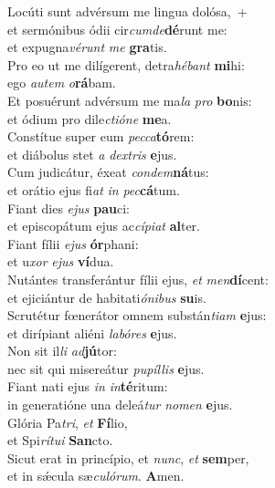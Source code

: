 \evenverse Locúti sunt advérsum me lingua dolósa,~+\\\evenverse  et sermónibus ódii cir\textit{cum}\textit{de}\textbf{dé}runt me:~\*\\
\evenverse et expugna\textit{vé}\textit{runt} \textit{me} \textbf{gra}tis.\\
\oddverse Pro eo ut me dilígerent, detra\textit{hé}\textit{bant} \textbf{mi}hi:~\*\\
\oddverse ego \textit{au}\textit{tem} \textit{o}\textbf{rá}bam.\\
\evenverse Et posuérunt advérsum me ma\textit{la} \textit{pro} \textbf{bo}nis:~\*\\
\evenverse et ódium pro dile\textit{cti}\textit{ó}\textit{ne} \textbf{me}a.\\
\oddverse Constítue super eum \textit{pec}\textit{ca}\textbf{tó}rem:~\*\\
\oddverse et diábolus stet \textit{a} \textit{dex}\textit{tris} \textbf{e}jus.\\
\evenverse Cum judicátur, éxeat \textit{con}\textit{dem}\textbf{ná}tus:~\*\\
\evenverse et orátio ejus fi\textit{at} \textit{in} \textit{pec}\textbf{cá}tum.\\
\oddverse Fiant dies \textit{e}\textit{jus} \textbf{pau}ci:~\*\\
\oddverse et episcopátum ejus ac\textit{cí}\textit{pi}\textit{at} \textbf{al}ter.\\
\evenverse Fiant fílii \textit{e}\textit{jus} \textbf{ór}phani:~\*\\
\evenverse et u\textit{xor} \textit{e}\textit{jus} \textbf{ví}dua.\\
\oddverse Nutántes transferántur fílii ejus, \textit{et} \textit{men}\textbf{dí}cent:~\*\\
\oddverse et ejiciántur de habitati\textit{ó}\textit{ni}\textit{bus} \textbf{su}is.\\
\evenverse Scrutétur fœnerátor omnem substán\textit{ti}\textit{am} \textbf{e}jus:~\*\\
\evenverse et dirípiant aliéni \textit{la}\textit{bó}\textit{res} \textbf{e}jus.\\
\oddverse Non sit il\textit{li} \textit{ad}\textbf{jú}tor:~\*\\
\oddverse nec sit qui misereátur \textit{pu}\textit{píl}\textit{lis} \textbf{e}jus.\\
\evenverse Fiant nati ejus \textit{in} \textit{in}\textbf{té}ritum:~\*\\
\evenverse in generatióne una deleá\textit{tur} \textit{no}\textit{men} \textbf{e}jus.\\
\oddverse Glória Pa\textit{tri}, \textit{et} \textbf{Fí}lio,~\*\\
\oddverse et Spi\textit{rí}\textit{tu}\textit{i} \textbf{San}cto.\\
\evenverse Sicut erat in princípio, et \textit{nunc}, \textit{et} \textbf{sem}per,~\*\\
\evenverse et in sǽcula sæ\textit{cu}\textit{ló}\textit{rum}. \textbf{A}men.\\
